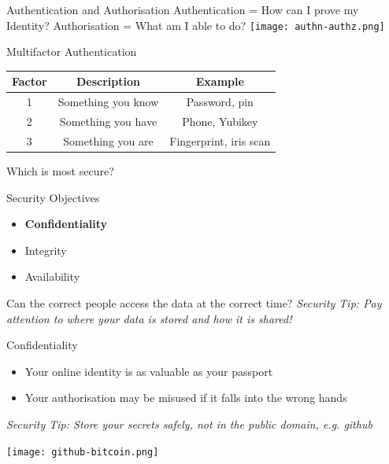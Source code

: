 \documentclass[aspectratio=169]{beamer}
\begin{document}
\begin{frame}{Authentication and Authorisation}
Authentication = How can I prove my Identity?
Authorisation = What am I able to do?
\texttt{[image: authn-authz.png]}
\end{frame}

\begin{frame}{Multifactor Authentication}
\begin{center}
\begin{tabular}{ |c|c|c| }
\hline
 \textbf{Factor} & \textbf{Description} & \textbf{Example}\\
\hline \hline
 1 & Something you know & Password, pin\\ \hline
 2 & Something you have & Phone, Yubikey \\  \hline
 3 & Something you are & Fingerprint, iris scan \\ \hline
\end{tabular}
\end{center}
Which is most secure?
\end{frame}


\begin{frame}{Security Objectives}
	\begin{itemize}
		\item \textbf{Confidentiality}
		\item Integrity
        \item Availability
	\end{itemize}
    Can the correct people access the data at the correct time?
	\linebreak
    \linebreak
    { \color{red} \textit{Security Tip: Pay attention to where your data is stored and how it is shared!} }
\end{frame}

\begin{frame}{Confidentiality}
\begin{itemize}
\item Your online identity is as valuable as your passport 
\item Your authorisation may be misused if it falls into the wrong hands
\end{itemize}
{ \color{red} \textit{Security Tip: Store your secrets safely, not in the public domain, e.g. github} }
\end{frame}

\begin{frame}{}
\begin{center}
\texttt{[image: github-bitcoin.png]}
\end{center}
\end{frame}
\end{document}
